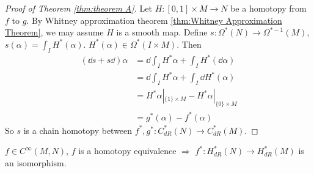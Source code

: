 \begin{proof}[Proof of Theorem \ref{thm:theorem A}]
    Let  $ H:[0,1]\times M\rightarrow N  $ be a homotopy from  $ f  $ to  $ g  $. By Whitney approximation theorem \ref{thm:Whitney Approximation Theorem}, we may assume  $ H  $ is a smooth map. Define  $ s:\Omega^*(N)\rightarrow \Omega^{*-1}(M) $,  $ s(\alpha)=\int_I H^*(\alpha) $.  $ H^*(\alpha)\in\Omega^*(I\times M) $. Then 
    \begin{equation}
        \begin{aligned}
            (\dd s+s\dd)\alpha&=\dd\int_I H^*\alpha+\int_I H^*(\dd \alpha)\\
            &=\dd\int_I H^*\alpha+\int_I \dd H^*(\alpha)\\
            &=H^*\alpha|_{\{1\}\times M}-H^*\alpha|_{\{0\}\times M}\\
            &=g^*(\alpha)-f^*(\alpha)
        \end{aligned}
    \end{equation}   
    So  $ s  $ is a chain homotopy between  $ f^*,g^*:C_{dR}^*(N)\rightarrow C_{dR}^*(M) $. 
\end{proof}
\begin{corollary}
     $ f\in C^\infty(M,N) $,  $ f  $ is a homotopy equivalence $ \Rightarrow  $  $ f^*:H_{dR}^*(N)\rightarrow H_{dR}^*(M) $ is an isomorphism.  
\end{corollary}